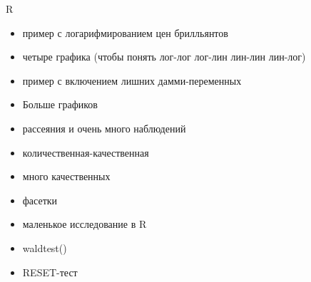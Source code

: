\documentclass[ignorenonframetext,]{beamer}
\begin{document}
\begin{frame}{R}

\begin{itemize}
\item
  пример с логарифмированием цен брилльянтов
\item
  четыре графика (чтобы понять лог-лог лог-лин лин-лин лин-лог)
\item
  пример с включением лишних дамми-переменных
\item
  Больше графиков
\item
  рассеяния и очень много наблюдений
\item
  количественная-качественная
\item
  много качественных
\item
  фасетки
\item
  маленькое исследование в R
\item
  waldtest()
\item
  RESET-тест
\end{itemize}

\end{frame}
\end{document}
